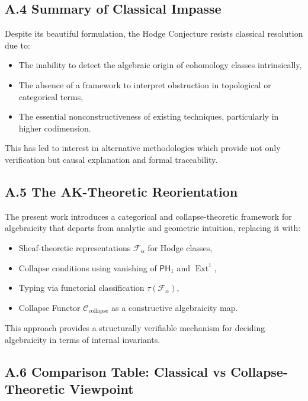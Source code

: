 \documentclass[11pt]{article}
\DeclareMathOperator{\Ext}{Ext}
\begin{document}
\subsection*{A.4 Summary of Classical Impasse}

Despite its beautiful formulation, the Hodge Conjecture resists classical resolution due to:

\begin{itemize}
  \item The inability to detect the algebraic origin of cohomology classes intrinsically,
  \item The absence of a framework to interpret obstruction in topological or categorical terms,
  \item The essential nonconstructiveness of existing techniques, particularly in higher codimension.
\end{itemize}

This has led to interest in alternative methodologies which provide not only verification but causal explanation and formal traceability.

\subsection*{A.5 The AK-Theoretic Reorientation}

The present work introduces a categorical and collapse-theoretic framework for algebraicity that departs from analytic and geometric intuition, replacing it with:

\begin{itemize}
  \item Sheaf-theoretic representations $\mathcal{F}_\alpha$ for Hodge classes,
  \item Collapse conditions using vanishing of $\mathsf{PH}_1$ and $\Ext^1$,
  \item Typing via functorial classification $\tau(\mathcal{F}_\alpha)$,
  \item Collapse Functor $\mathcal{C}_{\text{collapse}}$ as a constructive algebraicity map.
\end{itemize}

This approach provides a structurally verifiable mechanism for deciding algebraicity in terms of internal invariants.

\subsection*{A.6 Comparison Table: Classical vs Collapse-Theoretic Viewpoint}
\end{document}
